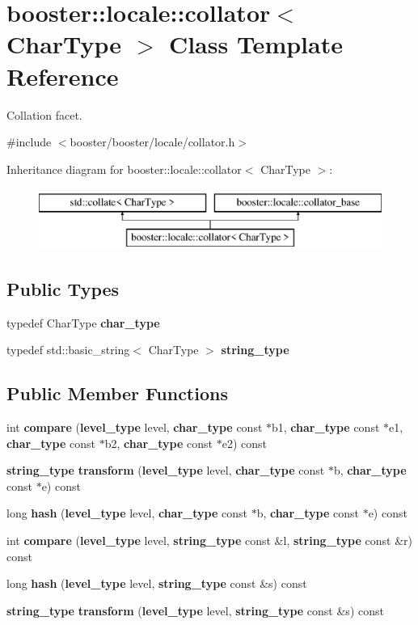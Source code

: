 \section{booster\+:\+:locale\+:\+:collator$<$ Char\+Type $>$ Class Template Reference}
\label{classbooster_1_1locale_1_1collator}


Collation facet.  




{\ttfamily \#include $<$booster/booster/locale/collator.\+h$>$}

Inheritance diagram for booster\+:\+:locale\+:\+:collator$<$ Char\+Type $>$\+:\begin{figure}[H]
\begin{center}
\leavevmode
\includegraphics[height=2.000000cm]{classbooster_1_1locale_1_1collator}
\end{center}
\end{figure}
\subsection*{Public Types}
\begin{DoxyCompactItemize}
\item 
typedef Char\+Type {\bf char\+\_\+type}
\item 
typedef std\+::basic\+\_\+string$<$ Char\+Type $>$ {\bf string\+\_\+type}
\end{DoxyCompactItemize}
\subsection*{Public Member Functions}
\begin{DoxyCompactItemize}
\item 
int {\bf compare} ({\bf level\+\_\+type} level, {\bf char\+\_\+type} const $\ast$b1, {\bf char\+\_\+type} const $\ast$e1, {\bf char\+\_\+type} const $\ast$b2, {\bf char\+\_\+type} const $\ast$e2) const 
\item 
{\bf string\+\_\+type} {\bf transform} ({\bf level\+\_\+type} level, {\bf char\+\_\+type} const $\ast$b, {\bf char\+\_\+type} const $\ast$e) const 
\item 
long {\bf hash} ({\bf level\+\_\+type} level, {\bf char\+\_\+type} const $\ast$b, {\bf char\+\_\+type} const $\ast$e) const 
\item 
int {\bf compare} ({\bf level\+\_\+type} level, {\bf string\+\_\+type} const \&l, {\bf string\+\_\+type} const \&r) const 
\item 
long {\bf hash} ({\bf level\+\_\+type} level, {\bf string\+\_\+type} const \&s) const 
\item 
{\bf string\+\_\+type} {\bf transform} ({\bf level\+\_\+type} level, {\bf string\+\_\+type} const \&s) const 
\end{DoxyCompactItemize}
